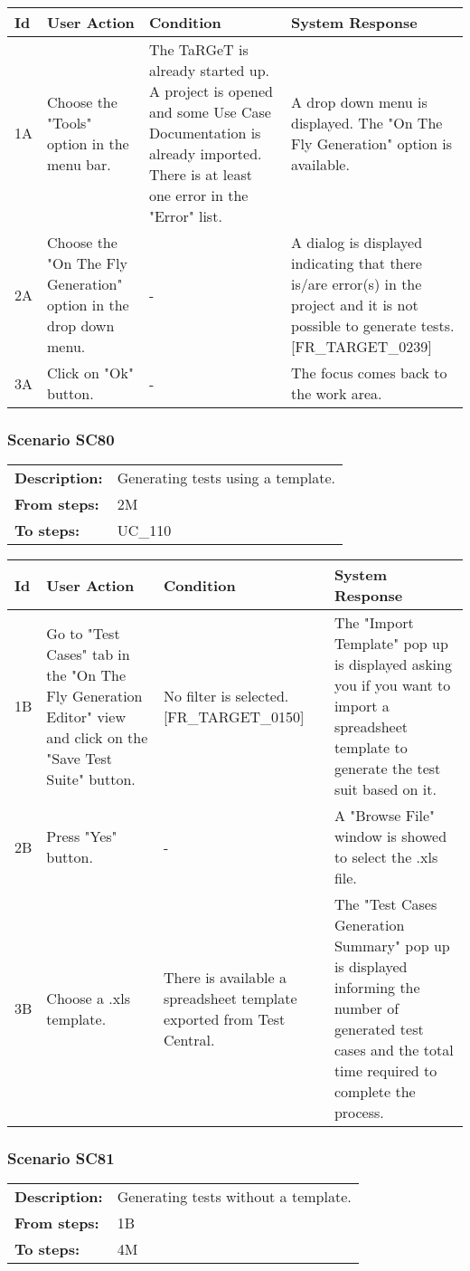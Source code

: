 \documentclass[a4paper,11pt]{article}
\newcommand{\bl}{\\ \hline}
\begin{document}
\begin{tabular}{|p{0.8in}|p{1.6in}|p{1.6in}|p{1.6in}|}
\hline
Id & User Action & Condition & System Response  \bl 
1A & Choose the "Tools" option in the menu bar.  & The TaRGeT is already started up. A project is opened
						and some Use Case Documentation is already imported. There is at
						least one error in the "Error" list. & A drop down menu is displayed. The "On The Fly
						Generation" option is available. \bl 
2A & Choose the "On The Fly Generation" option in the drop down
						menu.  & - & A dialog is displayed indicating that there is/are
						error(s) in the project and it is not possible to generate tests.
						[FR_TARGET_0239] \bl 
3A & Click on "Ok" button. & - & The focus comes back to the work area. \bl 
\end{tabular}
\subsubsection*{Scenario SC80}
\begin{tabular}{p{1in}p{4in}}
{\bf Description:} & Generating tests using a template. \\
{\bf From steps:} & 2M \\
{\bf To steps:} & UC_110#4M \\
\end{tabular}
 
\begin{tabular}{|p{0.8in}|p{1.6in}|p{1.6in}|p{1.6in}|}
\hline
Id & User Action & Condition & System Response  \bl 
1B & Go to "Test Cases" tab in the "On The Fly Generation
						Editor" view and click on the "Save Test Suite" button. & No filter is selected. [FR_TARGET_0150] & The "Import Template" pop up is displayed asking you if
						you want to import a spreadsheet template to generate the test
						suit based on it.  \bl 
2B & Press "Yes" button. & - & A "Browse File" window is showed to select the .xls file.
					 \bl 
3B & Choose a .xls template. & There is available a spreadsheet template exported from
						Test Central. & The "Test Cases Generation Summary" pop up is displayed
						informing the number of generated test cases and the total time
						required to complete the process.  \bl 
\end{tabular}
\subsubsection*{Scenario SC81}
\begin{tabular}{p{1in}p{4in}}
{\bf Description:} & Generating tests without a template. \\
{\bf From steps:} & 1B \\
{\bf To steps:} & 4M \\
\end{tabular}
 
\end{document}

